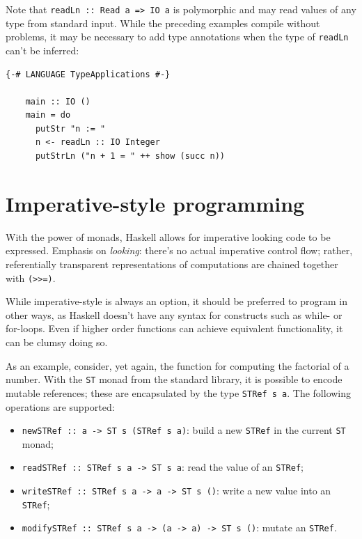 \documentclass[UdineBachThesis,american,11pt]{PhdThesis}
\begin{document}
  Note that \mbox{\texttt{readLn :: Read a => IO a}} is polymorphic and may read
  values of any type from standard input. While the preceding examples compile
  without problems, it may be necessary to add type annotations when the type of
  \mbox{\texttt{readLn}} can't be inferred:

  \begin{Verbatim}[gobble=4,fontsize=\small]
    {-# LANGUAGE TypeApplications #-}

    main :: IO ()
    main = do
      putStr "n := "
      n <- readLn :: IO Integer
      putStrLn ("n + 1 = " ++ show (succ n))
  \end{Verbatim}

  \section{Imperative-style programming}

  With the power of monads, Haskell allows for imperative looking code to be
  expressed. Emphasis on \emph{looking}: there's no actual imperative control
  flow; rather, referentially transparent representations of computations are
  chained together with \mbox{\texttt{(>>=)}}.

  While imperative-style is always an option, it should be preferred to program
  in other ways, as Haskell doesn't have any syntax for constructs such as
  while- or for-loops. Even if higher order functions can achieve equivalent
  functionality, it can be clumsy doing so.

  As an example, consider, yet again, the function for computing the factorial
  of a number. With the \mbox{\texttt{ST}} monad from the standard library, it
  is possible to encode mutable references; these are encapsulated by the type
  \mbox{\texttt{STRef s a}}. The following operations are supported:

  \begin{itemize}
    \item \mbox{\texttt{newSTRef :: a -> ST s (STRef s a)}}: build a new
    \mbox{\texttt{STRef}} in the current \mbox{\texttt{ST}} monad;

    \item \mbox{\texttt{readSTRef :: STRef s a -> ST s a}}: read the value of an
    \mbox{\texttt{STRef}};

    \item \mbox{\texttt{writeSTRef :: STRef s a -> a -> ST s ()}}: write a new
    value into an \mbox{\texttt{STRef}};

    \item \mbox{\texttt{modifySTRef :: STRef s a -> (a -> a) -> ST s ()}}:
    mutate an \mbox{\texttt{STRef}}.
  \end{itemize}
\end{document}
